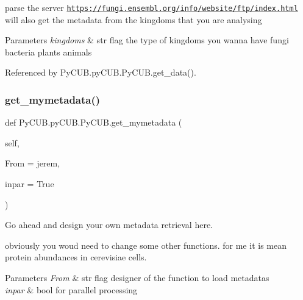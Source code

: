 parse the server \href{https://fungi.ensembl.org/info/website/ftp/index.html}{\tt https\+://fungi.\+ensembl.\+org/info/website/ftp/index.\+html} will also get the metadata from the kingdoms that you are analysing


\begin{DoxyParams}{Parameters}
{\em kingdoms} & str flag the type of kingdoms you wanna have \textquotesingle{}fungi\textquotesingle{} \textquotesingle{}bacteria\textquotesingle{} \textquotesingle{}plants\textquotesingle{} \textquotesingle{}animals\textquotesingle{} \\
\hline
\end{DoxyParams}


Referenced by Py\+C\+U\+B.\+py\+C\+U\+B.\+Py\+C\+U\+B.\+get\+\_\+data().

\mbox{\label{class_py_c_u_b_1_1py_c_u_b_1_1_py_c_u_b_a1ff011ae5b64518d60bedcf1b98314ef}} 
\subsubsection{\texorpdfstring{get\+\_\+mymetadata()}{get\_mymetadata()}}
{\footnotesize\ttfamily def Py\+C\+U\+B.\+py\+C\+U\+B.\+Py\+C\+U\+B.\+get\+\_\+mymetadata (\begin{DoxyParamCaption}\item[{}]{self,  }\item[{}]{From = {\ttfamily \textquotesingle{}jerem\textquotesingle{}},  }\item[{}]{inpar = {\ttfamily True} }\end{DoxyParamCaption})}



Go ahead and design your own metadata retrieval here. 

obviously you woud need to change some other functions. for me it is mean protein abundances in cerevisiae cells.


\begin{DoxyParams}{Parameters}
{\em From} & str flag designer of the function to load metadatas \\
\hline
{\em inpar} & bool for parallel processing \\
\hline
\end{DoxyParams}



